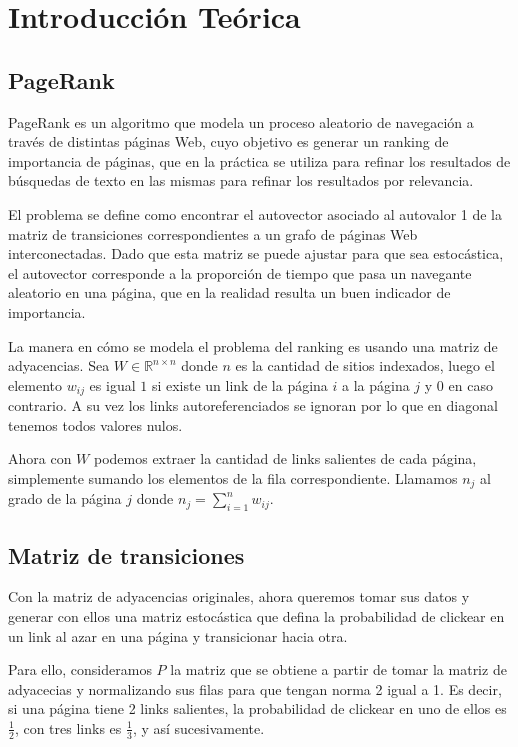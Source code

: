 \section{Introducción Teórica}

\subsection{PageRank}

PageRank es un algoritmo que modela un proceso aleatorio de navegación a través de
distintas páginas Web, cuyo objetivo es generar un ranking de importancia de páginas,
que en la práctica se utiliza para refinar los resultados de búsquedas de texto en las mismas
para refinar los resultados por relevancia.

El problema se define como encontrar el autovector asociado al autovalor 1 de la matriz de transiciones
correspondientes a un grafo de páginas Web interconectadas. Dado que esta matriz se puede ajustar
para que sea estocástica, el autovector corresponde a la proporción de tiempo que pasa un navegante
aleatorio en una página, que en la realidad resulta un buen indicador de importancia.

La manera en cómo se modela el problema del ranking es usando una matriz de adyacencias.
Sea $W \in \mathbb{R}^{n \times n}$ donde $n$ es la cantidad de sitios indexados, luego el elemento
$w_{ij}$ es igual $1$ si existe un link de la página $i$ a la página $j$ y $0$ en caso
contrario. A su vez los links autoreferenciados se ignoran por lo que en diagonal tenemos todos valores nulos.

Ahora con $W$ podemos extraer la cantidad de links salientes de cada página,
simplemente sumando los elementos de la fila correspondiente. Llamamos $n_j$
al grado de la página $j$ donde $n_j = \sum^{n}_{i = 1} w_{ij}$.

\subsection{Matriz de transiciones}

Con la matriz de adyacencias originales, ahora queremos tomar sus datos y generar con ellos
una matriz estocástica que defina la probabilidad de clickear en un link al azar
en una página y transicionar hacia otra.

Para ello, consideramos $P$ la matriz que se obtiene a partir de tomar la matriz de
adyacecias y normalizando sus filas para que tengan norma 2 igual a 1. Es decir,
si una página tiene 2 links salientes, la probabilidad de clickear en uno de ellos
es $\frac{1}{2}$, con tres links es $\frac{1}{3}$, y así sucesivamente.

